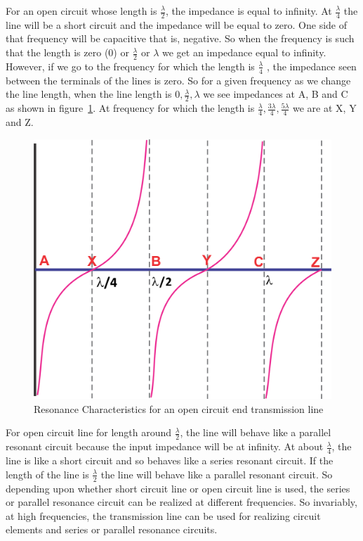 For an open circuit whose length is $ \frac{\lambda}{2} $, the impedance is equal to infinity. At $ \frac{\lambda}{4} $ the line will be a short circuit and the impedance will be equal to zero. One side of that frequency will be capacitive that is, negative. So when the frequency is such that the length is zero (0) or $ \frac{\lambda}{2} $ or $ \lambda$ we get an impedance equal to infinity.
However, if we go to the frequency for which the length is $ \frac{\lambda}{4} $ , the impedance seen between the terminals of the lines is zero. So for a given frequency as we change the line length, when the line
length is $0, \frac{\lambda}{2}, \lambda $ we see impedances at A, B and C as shown in figure~\ref{fig:group10diagram15}. At frequency for which the length is $ \frac{\lambda}{4}, \frac{3\lambda}{4}, \frac{5\lambda}{4} $ we are at X, Y and Z.
\begin{figure}[h]
\centering
\includegraphics[width=.8\linewidth]{./graphics/group10diagram14}
\caption{Resonance Characteristics for an open circuit end transmission line}
\label{fig:group10diagram15}
\end{figure}

For open circuit line for length around $ \frac{\lambda}{2} $, the line will behave like a parallel resonant circuit because the input impedance will be at infinity. At about $ \frac{\lambda}{4} $, the line is like a short circuit and so behaves like a series resonant circuit. If the length of the line is $ \frac{\lambda}{2} $ the line will behave like a parallel resonant circuit.
So depending upon whether short circuit line or open circuit line is used, the series or parallel resonance circuit can be realized at different frequencies. So invariably, at high frequencies, the transmission line can be used for realizing circuit elements and series or parallel resonance circuits.

